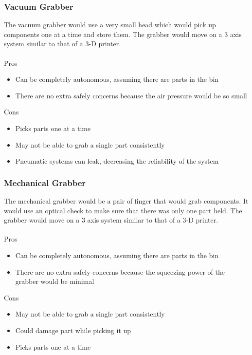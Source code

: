 \documentclass[12pt]{report}
\begin{document}
\subsubsection*{Vacuum Grabber}
The vacuum grabber would use a very small head which would pick up components one at a time and store them. The grabber would move on a 3 axis system similar to that of a 3-D printer. \\ \\
Pros
\begin{itemize}
\item Can be completely autonomous, assuming there are parts in the bin
\item There are no extra safely concerns because the air pressure would be so small
\end{itemize}
Cons
\begin{itemize}
\item Picks parts one at a time
\item May not be able to grab a single part consistently
\item Pneumatic systems can leak, decreasing the reliability of the system
\end{itemize}

\subsubsection*{Mechanical Grabber}
The mechanical grabber would be a pair of finger that would grab components. It would use an optical check to make sure that there was only one part held. The grabber would move on a 3 axis system similar to that of a 3-D printer. \\ \\
Pros
\begin{itemize}
\item Can be completely autonomous, assuming there are parts in the bin
\item There are no extra safely concerns because the squeezing power of the grabber would be minimal
\end{itemize}
Cons
\begin{itemize}
\item May not be able to grab a single part consistently
\item Could damage part while picking it up
\item Picks parts one at a time
\end{itemize}
\end{document}
